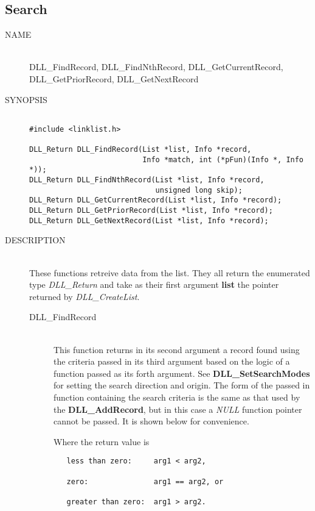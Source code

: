 \documentclass[10pt,letterpaper,titlepage]{article}
\begin{document}
\subsection{Search}
\begin{description}
\item[NAME]\quad\\
DLL\_FindRecord, DLL\_FindNthRecord, DLL\_GetCurrentRecord,\\
DLL\_GetPriorRecord, DLL\_GetNextRecord

\item[SYNOPSIS]
\begin{verbatim}

#include <linklist.h>

DLL_Return DLL_FindRecord(List *list, Info *record,
                          Info *match, int (*pFun)(Info *, Info *));
DLL_Return DLL_FindNthRecord(List *list, Info *record,
                             unsigned long skip);
DLL_Return DLL_GetCurrentRecord(List *list, Info *record);
DLL_Return DLL_GetPriorRecord(List *list, Info *record);
DLL_Return DLL_GetNextRecord(List *list, Info *record);
\end{verbatim}

\item[DESCRIPTION]\quad\\
These functions retreive data from the list.  They all return the enumerated type \emph{DLL\_Return} and take as their first argument \textbf{list} the pointer returned by \emph{DLL\_CreateList}.

 \begin{description}
 \item[DLL\_FindRecord]\quad\\
 This function returns in its second argument a record found using the criteria passed in its third argument based on the logic of a function passed as its forth argument.  See \textbf{DLL\_SetSearchModes} for setting the search direction and origin.  The form of the passed in function containing the search criteria is the same as that used by the \textbf{DLL\_AddRecord}, but in this case a \emph{NULL} function pointer cannot be passed.  It is shown below for convenience.
\vspace{8pt}

 Where the return value is
\begin{verbatim}
   less than zero:     arg1 < arg2,

   zero:               arg1 == arg2, or

   greater than zero:  arg1 > arg2.
\end{verbatim}


\end{description}
\end{description}
\end{document}
